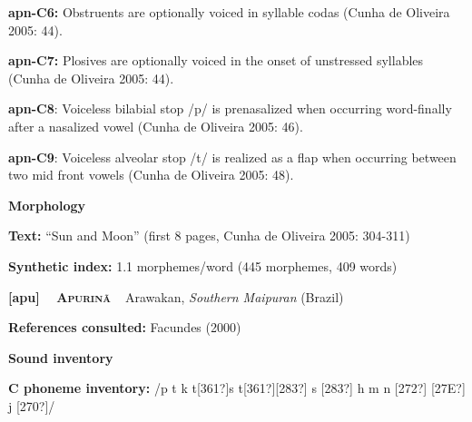 \begin{styleBody}
\textbf{apn-C6: }Obstruents are optionally voiced in syllable codas (Cunha de Oliveira 2005: 44).
\end{styleBody}

\begin{styleBody}
\textbf{apn-C7: }Plosives are optionally voiced in the onset of unstressed syllables (Cunha de Oliveira 2005: 44).
\end{styleBody}

\begin{styleBody}
\textbf{apn-C8}: Voiceless bilabial stop /p/ is prenasalized when occurring word-finally after a nasalized vowel (Cunha de Oliveira 2005: 46).
\end{styleBody}

\begin{styleBody}
\textbf{apn-C9}: Voiceless alveolar stop /t/ is realized as a flap when occurring between two mid front vowels (Cunha de Oliveira 2005: 48).
\end{styleBody}

\begin{styleBody}
\textbf{Morphology}
\end{styleBody}

\begin{styleBody}
\textbf{Text:} “Sun and Moon” (first 8 pages, Cunha de Oliveira 2005: 304-311)
\end{styleBody}

\begin{styleBody}
\textbf{Synthetic index: }1.1 morphemes/word (445 morphemes, 409 words)
\end{styleBody}

\clearpage\begin{styleBody}
\textbf{[apu] }\ \ \textbf{\textsc{Apurinã}}\textbf{\ \ }Arawakan, \textit{Southern Maipuran} (Brazil)
\end{styleBody}

\begin{styleBody}
\textbf{References consulted: }Facundes (2000)
\end{styleBody}

\begin{styleBody}
\textbf{Sound inventory}
\end{styleBody}

\begin{styleBody}
\textbf{C phoneme inventory:} /p t k t[361?]s t[361?][283?] s [283?] h m n [272?] [27E?] j [270?]/
\end{styleBody}

